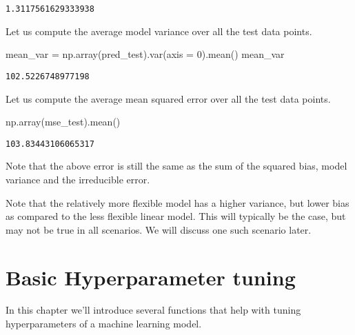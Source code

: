 \documentclass[
  letterpaper,
  DIV=11,
  numbers=noendperiod]{scrreprt}
\newenvironment{Shaded}{\begin{snugshade}}{\end{snugshade}}
\newcommand{\DecValTok}[1]{\textcolor[rgb]{0.68,0.00,0.00}{#1}}
\newcommand{\NormalTok}[1]{\textcolor[rgb]{0.00,0.23,0.31}{#1}}
\newcommand{\OperatorTok}[1]{\textcolor[rgb]{0.37,0.37,0.37}{#1}}
\begin{document}
\begin{verbatim}
1.3117561629333938
\end{verbatim}

Let us compute the average model variance over all the test data points.

\begin{Shaded}
\begin{Highlighting}[]
\NormalTok{mean\_var }\OperatorTok{=}\NormalTok{ np.array(pred\_test).var(axis }\OperatorTok{=} \DecValTok{0}\NormalTok{).mean()}
\NormalTok{mean\_var}
\end{Highlighting}
\end{Shaded}

\begin{verbatim}
102.5226748977198
\end{verbatim}

Let us compute the average mean squared error over all the test data
points.

\begin{Shaded}
\begin{Highlighting}[]
\NormalTok{np.array(mse\_test).mean()}
\end{Highlighting}
\end{Shaded}

\begin{verbatim}
103.83443106065317
\end{verbatim}

Note that the above error is still the same as the sum of the squared
bias, model variance and the irreducible error.

Note that the relatively more flexible model has a higher variance, but
lower bias as compared to the less flexible linear model. This will
typically be the case, but may not be true in all scenarios. We will
discuss one such scenario later.

\chapter{Basic Hyperparameter tuning}\label{basic-hyperparameter-tuning}

In this chapter we'll introduce several functions that help with tuning
hyperparameters of a machine learning model.
\end{document}
